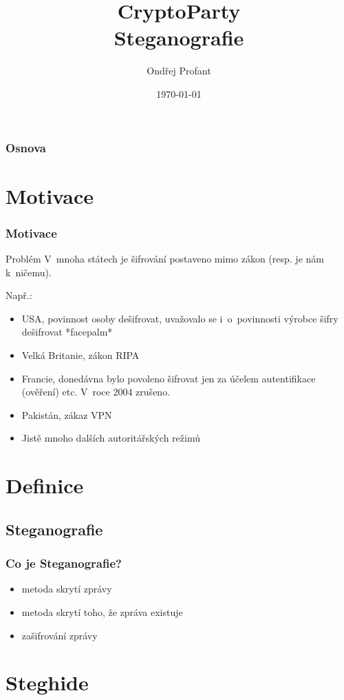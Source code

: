 \documentclass[xetex]{beamer}
\title{CryptoParty\\Steganografie}
\author{Ondřej Profant}
\institute[Piráti]{Česká pirátská strana}
\date{\today}
\begin{document}
\begin{frame}
  \titlepage
\end{frame}

\begin{frame}
  \frametitle{Osnova}
  \tableofcontents
\end{frame}	

\section{Motivace}
\begin{frame}
 \frametitle{Motivace}

	\begin{block}{Problém}
	V~mnoha státech je šifrování postaveno mimo zákon (resp. je nám k~ničemu).
	\end{block}

Např.:
 \begin{itemize}
    \item<2-6> USA, povinnost osoby dešifrovat, uvažovalo se i~o~povinnosti výrobce šifry dešifrovat *facepalm*
    \item<3-6> Velká Britanie, zákon RIPA
		\item<4-6> Francie, donedávna bylo povoleno šifrovat jen za účelem autentifikace (ověření) etc. V~roce 2004 zrušeno.
		\item<5-6> Pakistán, zákaz VPN
		\item<6> Jistě mnoho dalších autoritářských režimů
 \end{itemize}
\end{frame}


\section{Definice}

\subsection{Steganografie}
\begin{frame}
 \frametitle{Co je Steganografie?}
 \begin{itemize} 
		\item<2-4> metoda skrytí zprávy
		\item<3-4> metoda skrytí toho, že zpráva existuje
		\item<4-4> zašifrování zprávy
 \end{itemize}
\end{frame}

\section{Steghide}
\end{document}

